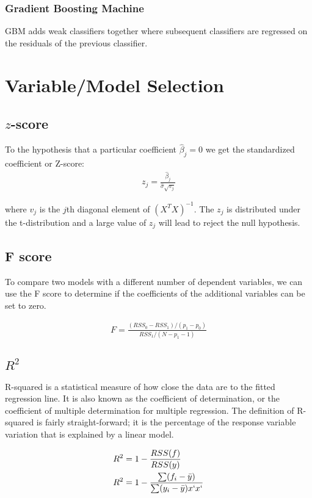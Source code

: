 \documentclass[12pt]{article}
\begin{document}
\subsubsection{Gradient Boosting Machine}
GBM adds weak classifiers together where subsequent classifiers are regressed on the residuals of the previous classifier.

\section{Variable/Model Selection}

\subsection{$z$-score}
To the hypothesis that a particular coefficient $\hat{\beta}_j = 0$ we get the standardized coefficient or Z-score:
\begin{align*}
z_j = \frac{\hat{\beta}_j}{\hat{\sigma}\sqrt{v_j}}
\end{align*}

where $v_j$ is the $j$th diagonal element of $(X^TX)^{-1}$. The $z_j$ is distributed under the t-distribution and a large value of $z_j$ will lead to reject the null hypothesis.

\subsection{F score}
To compare two models with a different number of dependent variables, we can use the F score to determine if the coefficients of the additional variables can be set to zero.

\begin{align*}
F = \frac{(RSS_0 - RSS_1)/(p_1 - p_0)}{RSS_1/(N-p_1 - 1)}
\end{align*}

\subsection{$R^2$}
R-squared is a statistical measure of how close the data are to the fitted regression line. It is also known as the coefficient of determination, or the coefficient of multiple determination for multiple regression. The definition of R-squared is fairly straight-forward; it is the percentage of the response variable variation that is explained by a linear model.

\begin{align*}
R^2 &= 1 - \frac{RSS(f)}{RSS(y)} \\
R^2 &= 1 - \frac{\sum (f_i - \bar{y})}{\sum (y_i - \bar{y})x`x`}
\end{align*}
\end{document}
